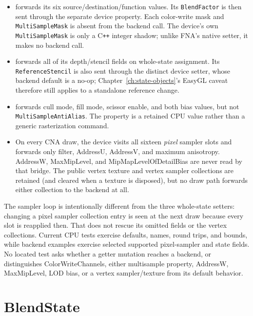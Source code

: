 \begin{itemize}
  \item {} forwards its six source/destination/function values. Its
    \texttt{BlendFactor} is then sent through the separate device property. Each color-write
    mask and \texttt{MultiSampleMask} is absent from the backend call. The device's own
    \texttt{MultiSampleMask} is only a C\texttt{++} integer shadow; unlike FNA's native setter,
    it makes no backend call.
  \item {} forwards all of its depth/stencil fields on whole-state
    assignment. Its \texttt{ReferenceStencil} is also sent through the distinct device setter,
    whose backend default is a no-op; Chapter~\ref{ch:state-objects}'s EasyGL caveat therefore
    still applies to a standalone reference change.
  \item {} forwards cull mode, fill mode, scissor enable, and both bias
    values, but not \texttt{MultiSampleAntiAlias}. The property is a retained CPU value rather
    than a generic rasterization command.
  \item On every CNA draw, the device visits all sixteen \emph{pixel} sampler slots and forwards
    only filter, AddressU, AddressV, and maximum anisotropy. AddressW, MaxMipLevel, and
    MipMapLevelOfDetailBias are never read by that bridge. The public vertex texture and vertex
    sampler collections are retained (and cleared when a texture is disposed), but no draw path
    forwards either collection to the backend at all.
\end{itemize}

The sampler loop is intentionally different from the three whole-state setters: changing a
pixel sampler collection entry is seen at the next draw because every slot is reapplied then.
That does not rescue its omitted fields or the vertex collections. Current CPU tests exercise
defaults, names, round trips, and bounds, while backend examples exercise selected supported
pixel-sampler and state fields. No located test asks whether a getter mutation reaches a backend,
or distinguishes ColorWriteChannels, either multisample property, AddressW, MaxMipLevel, LOD
bias, or a vertex sampler/texture from its default behavior.

\section{BlendState}

